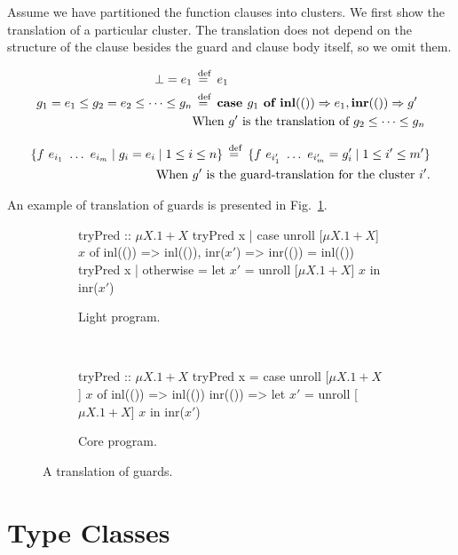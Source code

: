 Assume we have partitioned the function clauses into clusters. We first show
the translation of a particular cluster. The translation does not depend on the
structure of the clause besides the guard and clause body itself, so we omit
them.

\begin{align*}
  \bot = e_1 &\stackrel{\>\text{def}}{=}\> e_1 \\
  g_1 = e_1 \le g_2 = e_2 \le \dots \le g_n &\stackrel{\>\text{def}}{=}\> \textbf{case } g_1 \textbf{ of } \textbf{inl}(()) \Rightarrow e_1, \textbf{inr}(()) \Rightarrow g' \\
    &\text{When $g'$ is the translation of $g_2 \le \dots \le g_n$}
\end{align*}

\begin{align*}
  \{ f~e_{i_1}~\dots~e_{i_m} \mid g_i = e_i \mid 1 \le i \le n \} \stackrel{\>\text{def}}{=}\>
  \{ f~e_{i'_1}~\dots~e_{i'_m} = g_i' \mid 1 \le i' \le m' \} \\
    \text{When $g'$ is the guard-translation for the cluster $i'$.}
\end{align*}

An example of translation of guards is presented in
Fig.~\ref{fig:guards_translation}.

\begin{figure}[ht!]
  \centering
  \begin{subfigure}[b]{0.90\textwidth}
  \begin{rfuncodenum}
tryPred :: $\mu X . 1 + X$
tryPred x | case unroll [$\mu X . 1 + X$] $x$ of
              inl(()) => inl(()),
              inr($x'$) => inr(()) = inl(())
tryPred x | otherwise = let $x'$ = unroll [$\mu X . 1 + X$] $x$ in inr($x'$)
  \end{rfuncodenum}
  \caption{Light program.}
  \end{subfigure}
  ~
  \begin{subfigure}[b]{0.90\textwidth}
    \begin{rfuncodenum}
tryPred :: $\mu X . 1 + X$
tryPred x = case unroll [$\mu X . 1 + X$] $x$ of
              inl(()) => inl(())
              inr(()) => let $x'$ = unroll [$\mu X . 1 + X$] $x$ in inr($x'$)
    \end{rfuncodenum}
  \caption{Core program.}
  \end{subfigure}
  \caption{A translation of guards.}\label{fig:guards_translation}
\end{figure}

\section{Type Classes}

